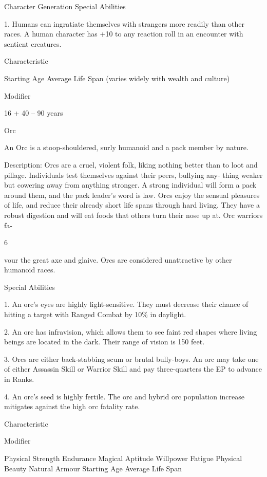 \begin{Chapter}{Character Generation}
Special Abilities 

1. Humans can ingratiate themselves with strangers 
more  readily  than  other  races.  A  human  character 
has  +10  to  any  reaction  roll  in  an  encounter  with 
sentient creatures. 

Characteristic  

Starting Age  
Average Life Span (varies 
widely with wealth and culture) 

Modifier 

16 + 
40 – 90 years 

Orc 

An  Orc  is  a  stoop-shouldered,  surly  humanoid 
and a pack member by nature. 

Description:  Orcs  are  a  cruel,  violent  folk,  liking 
nothing  better  than to  loot  and  pillage.  Individuals 
test  themselves  against  their  peers,  bullying  any-
thing  weaker  but  cowering  away  from  anything 
stronger.  A  strong  individual  will  form  a  pack 
around  them,  and  the  pack  leader’s  word  is  law. 
Orcs enjoy the sensual pleasures of life, and reduce 
their  already  short  life  spans  through  hard  living. 
They  have  a  robust  digestion  and  will  eat  foods 
that  others  turn  their  nose  up  at.  Orc  warriors  fa-

6 

vour the great axe and glaive. Orcs are considered 
unattractive by other humanoid races. 

Special Abilities 

1.  An  orc’s  eyes  are  highly  light-sensitive.  They 
must  decrease  their chance  of  hitting  a  target  with 
Ranged Combat by 10\% in daylight. 

2. An orc has infravision, which allows them to see 
faint red shapes where  living beings are located in 
the dark. Their range of vision is 150 feet. 

3.  Orcs  are  either  back-stabbing  scum  or  brutal 
bully-boys. An orc may take one of either Assassin 
Skill or Warrior Skill and pay three-quarters the EP 
to advance in Ranks. 

4.  An orc’s seed is highly fertile.  The orc and hybrid orc
population increase mitigates against the high orc fatality rate.

Characteristic  

Modifier 

Physical Strength  
Endurance  
Magical Aptitude  
Willpower  
Fatigue  
Physical Beauty  
Natural Armour  
Starting Age  
Average Life Span 


\end{Chapter}
